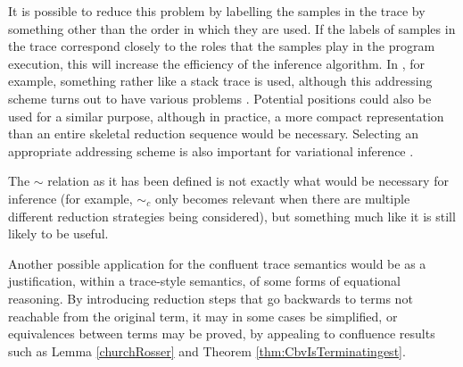 It is possible to reduce this problem by labelling the samples in the trace by something other than the order in which they are used. If the labels of samples in the trace correspond closely to the roles that the samples play in the program execution, this will increase the efficiency of the inference algorithm. 
In \cite{wingate2011lightweight}, for example, something rather like a stack trace is used, although this addressing scheme turns out to have various problems \citep{kiselyov2016problems,Hur2015a}. 
Potential positions could also be used for a similar purpose, although in practice, a more compact representation than an entire skeletal reduction sequence would be necessary. 
Selecting an appropriate addressing scheme is also important for variational inference \citep{paige2016automatic}.

The $\sim$ relation as it has been defined is not exactly what would be necessary for inference (for example, $\sim_c$ only becomes relevant when there are multiple different reduction strategies being considered), but something much like it is still likely to be useful.

\medskip

Another possible application for the confluent trace semantics would be as a justification, within a trace-style semantics, of some forms of equational reasoning. 
By introducing reduction steps that go backwards to terms not reachable from the original term, it may in some cases be simplified, or equivalences between terms may be proved, by appealing to confluence results such as Lemma \ref{churchRosser} and Theorem \ref{thm:CbvIsTerminatingest}.
 
